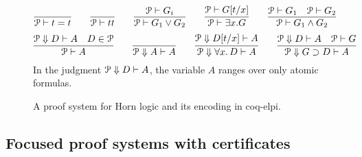 \begin{figure}
\newcommand{\XXi}{\Pscr}
\newcommand{\bc}[2]{\Pscr\Downarrow #1 \vdash #2}
\[
\infer{\XXi\vdash t = t}
{%
}
\qquad
\infer{\XXi\vdash \true}
{%
}
\qquad
\infer{\XXi\vdash G_1\vee G_2}
{\XXi\vdash G_i%
}
\qquad
\infer{\XXi\vdash \exists x. G}
{\XXi\vdash G[t/x]%
}
\qquad 
\infer{\XXi\vdash G_1\wedge G_2}
{\XXi\vdash G_1\quad \XXi\vdash G_2%
}
\]
\vskip -18pt
\[
\infer{\XXi\vdash A}
      {\bc D A \quad D \in \Pscr}\qquad
  \infer{\bc A A}{}{}\qquad
  \infer{\bc{\forall x.\, D} A}{\bc{D[t/x]} A}{}\qquad
  \infer{\bc{G\supset D} A}{\bc D A\quad \XXi\vdash G}{}
\]
In the judgment $\bc{D}{A}$, the variable $A$ ranges over only atomic
formulas.

\caption{A proof system for Horn logic and its encoding in coq-elpi.}
\label{fig:interp}
%
%
\end{figure}



\subsection{Focused proof systems with certificates}
\label{ssec:focused}

